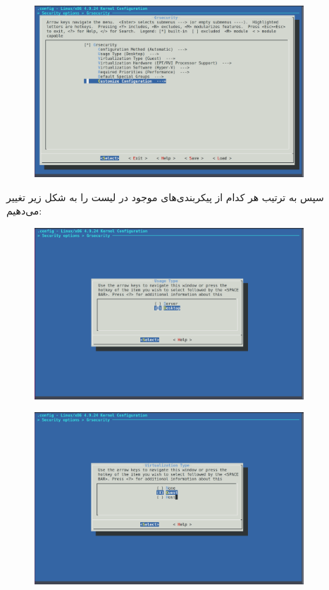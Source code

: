 \documentclass{article}
\begin{document}
\begin{enumerate}
\newpage
\begin{figure}[ht]
	\centering	
	\includegraphics[width = 0.9\textwidth]{images/5.png}
\end{figure}
سپس به ترتیب هر کدام از پیکر‌بندی‌های موجود در لیست را به شکل زیر تغییر می‌دهیم:
\begin{figure}[ht]
	\centering	
	\includegraphics[width = 0.9\textwidth]{images/6.png}
\end{figure}
\newpage
\begin{figure}[ht]
	\centering	
	\includegraphics[width = 0.9\textwidth]{images/7.png}

\end{figure}
\end{enumerate}
\end{document}
